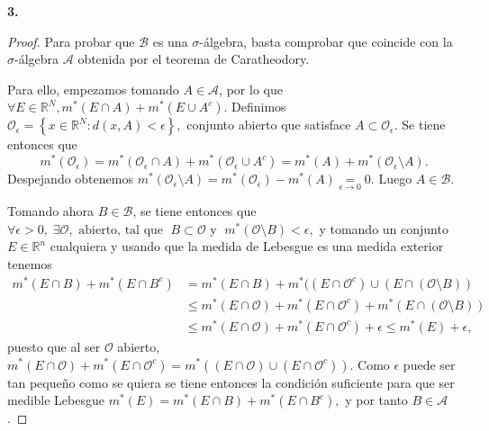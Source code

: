\documentclass[11pt,a4paper,draft]{article}
\begin{document}
\vskip 10mm
{\bf 3.}
\begin{proof}
  Para probar que $ \mathcal B $ es una $ \sigma $-álgebra, basta comprobar que coincide con la $ \sigma $-álgebra $ \mathcal A $ obtenida por el teorema de Caratheodory.

  \vskip 5mm
  Para ello, empezamos tomando $ A \in \mathcal A $, por lo que 
  $
    \forall E \in \mathbb R^N, m^*(E \cap A) + m^*(E \cup A^c).
  $
  Definimos
  $
    \mathcal O_\epsilon = \left\{ x \in \mathbb R^N: d(x, A) < \epsilon\right\},
  $
  conjunto abierto que satisface $ A \subset \mathcal O_\epsilon $. Se tiene entonces que
  $$
    m^*(\mathcal O_\epsilon) = m^*(\mathcal O_\epsilon \cap A) + m^*(\mathcal O_\epsilon \cup A^c) = m^*(A) + m^*(\mathcal O_\epsilon \setminus A).
  $$
  Despejando obtenemos $m^*(\mathcal O_\epsilon \setminus A) = m^*(\mathcal O_\epsilon) - m^*(A) \underset{\epsilon \to 0}{=} 0 $. Luego $ A \in \mathcal B $. 

  \vskip 5mm
    Tomando ahora $ B \in \mathcal B $, se tiene entonces que 
    $
      \forall \epsilon>0, \; \exists \mathcal{O},  \mbox{ abierto, tal que }\; B\subset \mathcal{O} \mbox{ y } \; m^*(\mathcal{O}\setminus B)<\epsilon,
    $
    y tomando un conjunto $ E \in \mathbb R^n $ cualquiera y usando que la medida de Lebesgue es una medida exterior tenemos
    \begin{align*}
      m^*(E \cap B) + m^*(E \cap B^c) &= m^*(E \cap B) + m^*((E \cap \mathcal O^c) \cup (E \cap (\mathcal O \setminus B)) \\
      &\leq m^*(E \cap \mathcal O) + m^*(E \cap \mathcal O^c) + m^*(E \cap (\mathcal O \setminus B)) \\
      &\leq m^*(E \cap \mathcal O) + m^*(E \cap \mathcal O^c) + \epsilon \leq m^*(E) + \epsilon,
    \end{align*}
  puesto que al ser $ \mathcal O $ abierto, $m^*(E \cap \mathcal O) + m^*(E \cap \mathcal O^c) = m^*((E \cap \mathcal O) \cup (E \cap \mathcal O^c))$. Como $ \epsilon $ puede ser tan pequeño como se quiera se tiene entonces la condición suficiente para que ser medible Lebesgue
  $
    m^*(E) = m^*(E \cap B) + m^*(E \cap B^c),
  $
  y por tanto $ B \in \mathcal A $.

  \vskip 5mm

\end{proof}
\end{document}
